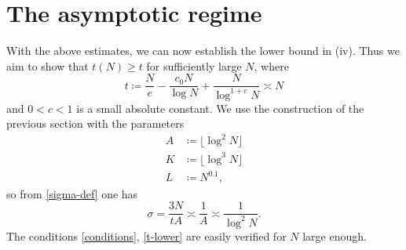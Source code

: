 \documentclass[12pt,a4paper,reqno]{amsart}
\numberwithin{equation}{section}
\theoremstyle{plain}
\theoremstyle{definition}
\begin{document}
\section{The asymptotic regime}

With the above estimates, we can now establish the lower bound in (iv).  Thus we aim to show that $t(N) \geq t$ for sufficiently large $N$, where
\begin{equation}\label{main-lower}
   t \coloneqq \frac{N}{e} - \frac{c_0 N}{\log N} + \frac{N}{\log^{1+c} N} \asymp N
\end{equation}
and $0 < c < 1$ is a small absolute constant. We use the construction of the previous section with the parameters
\begin{align}
  A &\coloneqq \lfloor \log^2 N \rfloor\label{a-asym}\\
K &\coloneqq \lfloor \log^3 N \rfloor \label{k-asym} \\
L &\coloneqq N^{0.1},\label{l-asym}
\end{align}
so from \eqref{sigma-def} one has
\begin{equation}\label{sigma-alt}
   \sigma = \frac{3N}{tA} \asymp \frac{1}{A} \asymp \frac{1}{\log^2 N}.
\end{equation}
The conditions \eqref{conditions}, \eqref{t-lower} are easily verified for $N$ large enough.
\end{document}
